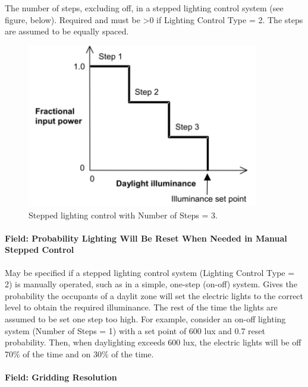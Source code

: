The number of steps, excluding off, in a stepped lighting control system (see figure, below). Required and must be \textgreater{}0 if Lighting Control Type = 2. The steps are assumed to be equally spaced.

\begin{figure}[hbtp] %
\centering
\includegraphics[width=0.9\textwidth, height=0.9\textheight, keepaspectratio=true]{media/image106.png}
\caption{Stepped lighting control with Number of Steps = 3. \protect \label{fig:stepped-lighting-control-with-number-of-steps-001}}
\end{figure}

\paragraph{Field: Probability Lighting Will Be Reset When Needed in Manual Stepped Control}\label{field-probability-lighting-will-be-reset-when-needed-in-manual-stepped-control-1}

May be specified if a stepped lighting control system (Lighting Control Type = 2) is manually operated, such as in a simple, one-step (on-off) system. Gives the probability the occupants of a daylit zone will set the electric lights to the correct level to obtain the required illuminance. The rest of the time the lights are assumed to be set one step too high. For example, consider an on-off lighting system (Number of Steps = 1) with a set point of 600 lux and 0.7 reset probability. Then, when daylighting exceeds 600 lux, the electric lights will be off 70\% of the time and on 30\% of the time.

\paragraph{Field: Gridding Resolution}\label{field-gridding-resolution}

